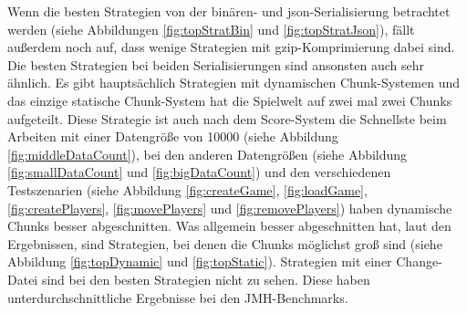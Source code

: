 Wenn die besten Strategien von der binären- und \ac{json}-Serialisierung betrachtet werden (siehe Abbildungen \ref{fig:topStratBin} und \ref{fig:topStratJson}), fällt außerdem noch auf, dass wenige Strategien mit \ac{gzip}-Komprimierung dabei sind. Die besten Strategien bei beiden Serialisierungen sind ansonsten auch sehr ähnlich. Es gibt hauptsächlich Strategien mit dynamischen Chunk-Systemen und das einzige statische Chunk-System hat die Spielwelt auf zwei mal zwei Chunks aufgeteilt. Diese Strategie ist auch nach dem Score-System die Schnellste beim Arbeiten mit einer Datengröße von 10000 (siehe Abbildung \ref{fig:middleDataCount}), bei den anderen Datengrößen (siehe Abbildung \ref{fig:smallDataCount} und \ref{fig:bigDataCount}) und den verschiedenen Testszenarien (siehe Abbildung \ref{fig:createGame}, \ref{fig:loadGame}, \ref{fig:createPlayers}, \ref{fig:movePlayers} und \ref{fig:removePlayers}) haben dynamische Chunks besser abgeschnitten. Was allgemein besser abgeschnitten hat, laut den Ergebnissen, sind Strategien, bei denen die Chunks möglichst groß sind (siehe Abbildung \ref{fig:topDynamic} und \ref{fig:topStatic}). Strategien mit einer Change-Datei sind bei den besten Strategien nicht zu sehen. Diese haben unterdurchschnittliche Ergebnisse bei den JMH-Benchmarks.


